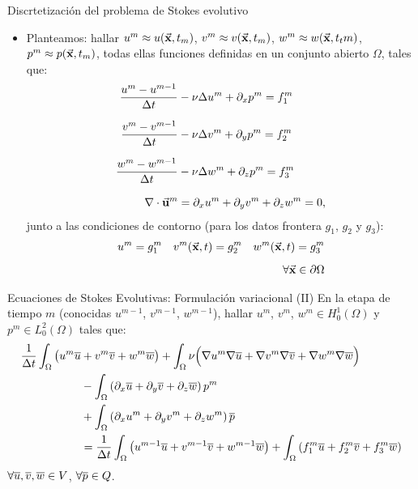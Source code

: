 \documentclass[9pt, dvipsnames,]{beamer}
\newcommand{\Vtest}{\ensuremath{V}}
\begin{document}
\begin{frame}{Discrtetización del problema de Stokes evolutivo}

  \begin{itemize}

  \item Planteamos: hallar $u^m\approx u(\vec{\mathbf{x}},t_m)$, $v^m\approx v(\vec{\mathbf{x}},t_m)$, $w^m\approx w(\vec{\mathbf{x}},t_tm)$, $p^m\approx p(\vec{\mathbf{x}},t_m)$, todas ellas funciones definidas en un conjunto
    abierto $\Omega$, tales que:
    \begin{align}
      \frac{u^m - u^{m-1}}{\Delta t} &- \nu\Delta u^m + \partial_x p^m = f^m_1
      \\[0.7em]
      \frac{v^m - v^{m-1}}{\Delta t} &- \nu\Delta v^m + \partial_y p^m = f^m_2
      \\[0.7em]
      \frac{w^m - w^{m-1}}{\Delta t} &- \nu\Delta w^m + \partial_z p^m = f^m_3
      \\[0.8em]
      \nabla\cdot{}\vec{\mathbf{u}}^m &= \partial_x u^m + \partial_y v^m + \partial_z w^m = 0,
    \end{align}
    junto a las condiciones de contorno (para los datos frontera $g_1$, $g_2$ y $g_3$):
    \begin{align}
      u^m=g_1^m
      \quad
      v^m(\vec{\mathbf{x}},t)=g_2^m
      \quad
      w^m(\vec{\mathbf{x}},t)=g_3^m
      \\[0.5em]
    \forall \vec{\mathbf{x}}\in\partial\Omega
    \end{align}
  \end{itemize}

\end{frame}

\begin{frame}{Ecuaciones de Stokes Evolutivas: Formulación variacional (II)}
  En la etapa de tiempo $m$ (conocidas $u^{m-1}$, $v^{m-1}$, $w^{m-1}$), hallar $u^m$, $v^m$, $w^m \in H^1_0(\Omega)$ y $p^m\in L_0^2(\Omega)$ tales que:
    \begin{align*}
      \frac{1}{\Delta t} \int_\Omega\big(
      u^m \overline u
      &+ {v^m} \overline v
      + {w^m} \overline w
      \big)
      + \int_\Omega \nu\Big( \nabla u^m \nabla \overline u +
      \nabla v^m\nabla \overline v + \nabla w^m\nabla \overline w \Big)
      \\
      &- \int_\Omega \left( \partial_x \overline u + \partial_y \overline v + \partial_z \overline w \right) p^m
      \\
      &+ \int_\Omega \left( \partial_x u^m + \partial_y v^m  + \partial_z w^m \right) \overline {p}
      \\
      &=
      \frac{1}{\Delta t} \int_\Omega\big(
      u^{m-1} \overline u
      + {v^{m-1}} \overline v
      + {w^{m-1}} \overline w
      \big)
       + \int_\Omega \left( f^m_1 \overline u + f^m_2 \overline v + f^m_3 \overline w \right)
    \end{align*}
    $\forall \bu,\bv, \bw\in \Vtest$, $\forall\overline {p}\in Q$.

\end{frame}
\end{document}
